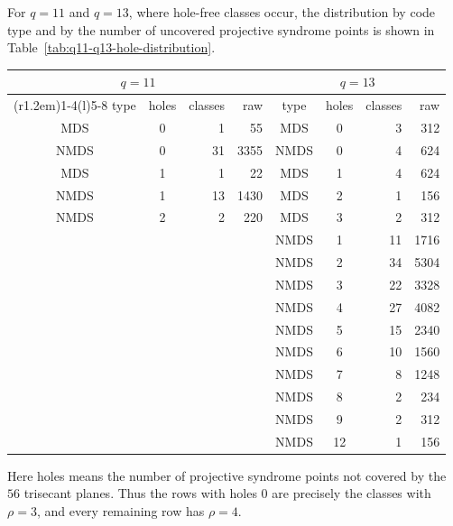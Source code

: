 \documentclass[11pt]{article}
\theoremstyle{plain}
\theoremstyle{definition}
\begin{document}
For \(q=11\) and \(q=13\), where hole-free classes occur, the distribution by
code type and by the number of uncovered projective syndrome points is shown
in Table~\ref{tab:q11-q13-hole-distribution}.
\begin{center}
\label{tab:q11-q13-hole-distribution}
\scriptsize
\begin{tabular}{c c r r@{\qquad}c c r r}
\toprule
\multicolumn{4}{c}{\(q=11\)}&
\multicolumn{4}{c}{\(q=13\)}\\
\cmidrule(r{1.2em}){1-4}\cmidrule(l){5-8}
type&holes&classes&raw&type&holes&classes&raw\\
\midrule
MDS  &0&1 &55   & MDS  &0 &3 &312\\
NMDS &0&31&3355 & NMDS &0 &4 &624\\
MDS  &1&1 &22   & MDS  &1 &4 &624\\
NMDS &1&13&1430 & MDS  &2 &1 &156\\
NMDS &2&2 &220  & MDS  &3 &2 &312\\
     & &  &     & NMDS &1 &11&1716\\
     & &  &     & NMDS &2 &34&5304\\
     & &  &     & NMDS &3 &22&3328\\
     & &  &     & NMDS &4 &27&4082\\
     & &  &     & NMDS &5 &15&2340\\
     & &  &     & NMDS &6 &10&1560\\
     & &  &     & NMDS &7 &8 &1248\\
     & &  &     & NMDS &8 &2 &234\\
     & &  &     & NMDS &9 &2 &312\\
     & &  &     & NMDS &12&1 &156\\
\bottomrule
\end{tabular}
\end{center}
Here holes means the number of projective syndrome points not covered by the
\(56\) trisecant planes.  Thus the rows with holes \(0\) are precisely the
classes with \(\rho=3\), and every remaining row has \(\rho=4\).
\end{document}
